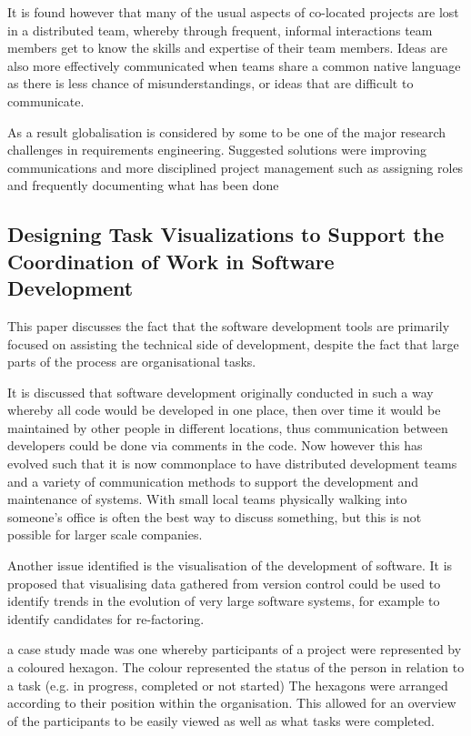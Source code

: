 \documentclass{l4proj}
\begin{document}
It is found however that many of the usual aspects of co-located projects are lost in a distributed team, whereby through frequent, informal interactions team members get to know the skills and expertise of their team members.  Ideas are also more effectively communicated when teams share a common native language as there is less chance of misunderstandings, or ideas that are difficult to communicate.

As a result globalisation is considered by some to be one of the major research challenges in requirements engineering.  Suggested solutions were improving communications and more disciplined project management such as assigning roles and frequently documenting what has been done


\subsection{Designing Task Visualizations to Support the Coordination of Work in Software Development}

This paper discusses the fact that the software development tools are primarily focused on assisting the technical side of development, despite the fact that large parts of the process are organisational tasks.

It is discussed that software development originally conducted in such a way whereby all code would be developed in one place, then over time it would be maintained by other people in different locations, thus communication between developers could be done via comments in the code.  Now however this has evolved such that it is now commonplace to have distributed development teams and a variety of communication methods to support the development and maintenance of systems.  With small local teams physically walking into someone's office is often the best way to discuss something, but this is not possible for larger scale companies.

Another issue identified is the visualisation of the development of software.  It is proposed that visualising data gathered from version control could be used to identify trends in the evolution of very large software systems, for example to identify candidates for re-factoring.  

a case study made was one whereby participants of a project were represented by a coloured hexagon.  The colour represented the status of the person in relation to a task (e.g. in progress, completed or not started)
The hexagons were arranged according to their position within the organisation.  This allowed for an overview of the participants to be easily viewed as well as what tasks were completed.
\end{document}
